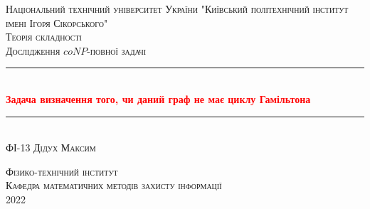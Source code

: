 \documentclass[14pt]{article}
\begin{document}
	
	\begin{titlepage} 
		\newcommand{\HRule}{\rule{\linewidth}{0.3mm}}
		\center 
		
		\textsc{\large Національний технічний університет України
			"Київський політехнічний інститут імені Ігоря Сікорського"}\\[1.5cm]
		
		\vspace{3cm}
		\textsc{\large Теорія складності}\\[0.5cm]
		
		\textsc{\large Дослідження \(coNP\)-повної задачі}\\[0.5cm] 
		
		\HRule\\[0.4cm]
		
		{\huge\bfseries \textcolor{red}{\textbf{Задача визначення того, чи даний граф не має циклу Гамільтона}}}\\[0.4cm]
		
		\HRule\\[1.5cm]
		\textsc{\large ФІ-13 Дідух Максим}\\[0.5cm]
		
		\vspace{4.5cm}
		
		\textsc{\Large Фізико-технічний інститут}\\[0.5cm]
		\textsc{\large Кафедра математичних методів захисту інформації}\\[0.5cm]
		{\large {2022}} 
		
		
		
	\end{titlepage}
	
\end{document}
